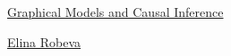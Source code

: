 \documentclass[11pt]{article}
\begin{document}
	\kaishu 
	\setcounter{section}{0}
	\begin{center}
		{\LARGE  \href{https://sites.google.com/view/ubc-math-605d-causality/class-overview}{Graphical Models and Causal Inference}}
		
		
		{\large \href{https://personal.math.ubc.ca/~erobeva/index.html}{Elina Robeva}}
	\end{center}
\setcounter{page}{1}



\vspace{-1cm}
\end{document}
